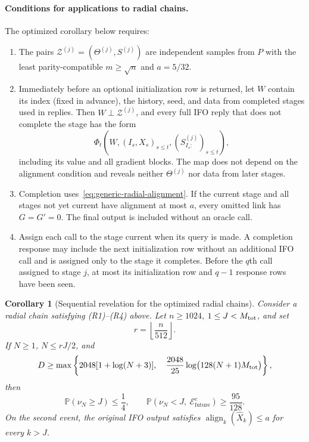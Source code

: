 \documentclass{article}
\newtheorem{corollary}[theorem]{Corollary}
\theoremstyle{definition}
\newcommand{\Prob}{\mathbb{P}}
\newcommand{\cZ}{\mathcal{Z}}
\newcommand{\cEfuture}{\mathcal{E}_{\mathrm{future}}}
\begin{document}
\paragraph{Conditions for applications to radial chains.}
The optimized corollary below requires:
\begin{enumerate}[label=(R\arabic*),leftmargin=*,itemsep=2pt,topsep=2pt]
 \item The pairs $\cZ^{(j)}=(\Theta^{(j)},S^{(j)})$ are independent samples from $P$
 with the least parity-compatible $m\ge\sqrt n$ and $a=5/32$.
 \item Immediately before an optional initialization row is returned, let $W$
 contain its index (fixed in advance), the history, seed, and data from
 completed stages used in replies.  Then $W\perp\cZ^{(j)}$, and every full IFO
 reply that does not complete the stage has the form
 \[
  \Phi_t\!\left(W,(I_s,X_s)_{s\le t},
                    (S^{(j)}_{I_s:})_{s\le t}\right),
 \]
 including its value and all gradient blocks.  The map does not depend on the
 alignment condition and reveals neither $\Theta^{(j)}$ nor data from later stages.
 \item Completion uses~\eqref{eq:generic-radial-alignment}.  If the current stage and
 all stages not yet current have alignment at most $a$, every omitted link has
 $G=G'=0$.  The final output is included without an oracle call.
 \item Assign each call to the stage current when its query is made.  A
 completion response may include the next initialization row without an
 additional IFO call and is assigned only to the stage it completes.  Before
 the $q$th call assigned to
 stage $j$, at most its initialization row and $q-1$ response rows have been
 seen.
\end{enumerate}

\begin{corollary}[Sequential revelation for the optimized radial chains]
\label{cor:optimized-radial-chain}
Consider a radial chain satisfying \emph{(R1)--(R4)} above.  Let $n\ge1024$,
$1\le J<M_{\rm tot}$, and set
\begin{equation}
 r=\left\lfloor\frac n{512}\right\rfloor.
\end{equation}
If $N\ge1$, $N\le rJ/2$, and
\begin{equation}
 D\ge\max\left\{
 2048[1+\log(N+3)],\quad
 \frac{2048}{25}\log\bigl(128(N+1)M_{\rm tot}\bigr)
 \right\},
 \label{eq:shared-radial-dimension}
\end{equation}
then
\begin{equation}
 \Prob(\nu_N\ge J)\le\frac14,
 \qquad
 \Prob(\nu_N<J,\ \cEfuture^c)\ge\frac{95}{128}.
 \label{eq:shared-radial-revelation}
\end{equation}
On the second event, the original IFO output satisfies
$\operatorname{align}_k(\widehat X_k)\le a$ for every $k>J$.
\end{corollary}
\end{document}
